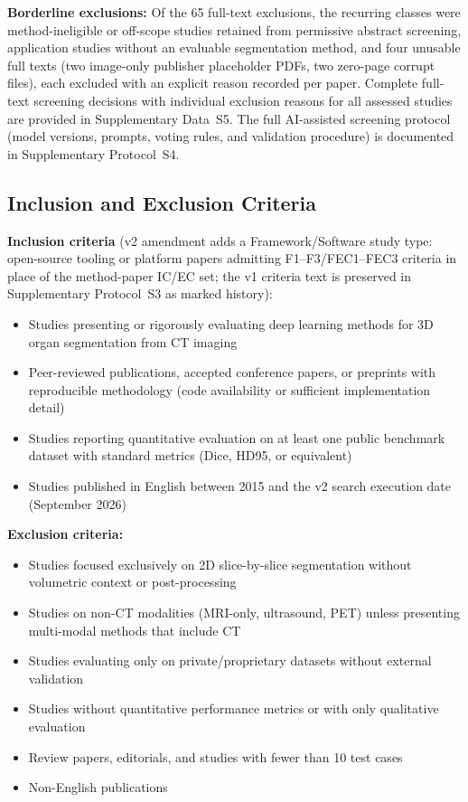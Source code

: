 \textbf{Borderline exclusions:} Of the 65 full-text exclusions, the recurring classes were method-ineligible or off-scope studies retained from permissive abstract screening, application studies without an evaluable segmentation method, and four unusable full texts (two image-only publisher placeholder PDFs, two zero-page corrupt files), each excluded with an explicit reason recorded per paper. Complete full-text screening decisions with individual exclusion reasons for all assessed studies are provided in Supplementary Data~S5. The full AI-assisted screening protocol (model versions, prompts, voting rules, and validation procedure) is documented in Supplementary Protocol~S4.

\subsection{Inclusion and Exclusion Criteria}

\textbf{Inclusion criteria} (v2 amendment adds a Framework/Software study type: open-source tooling or platform papers admitting F1--F3/FEC1--FEC3 criteria in place of the method-paper IC/EC set; the v1 criteria text is preserved in Supplementary Protocol~S3 as marked history):
\begin{itemize}
    \item Studies presenting or rigorously evaluating deep learning methods for 3D organ segmentation from CT imaging
    \item Peer-reviewed publications, accepted conference papers, or preprints with reproducible methodology (code availability or sufficient implementation detail)
    \item Studies reporting quantitative evaluation on at least one public benchmark dataset with standard metrics (Dice, HD95, or equivalent)
    \item Studies published in English between 2015 and the v2 search execution date (September 2026)
\end{itemize}

\textbf{Exclusion criteria:}
\begin{itemize}
    \item Studies focused exclusively on 2D slice-by-slice segmentation without volumetric context or post-processing
    \item Studies on non-CT modalities (MRI-only, ultrasound, PET) unless presenting multi-modal methods that include CT
    \item Studies evaluating only on private/proprietary datasets without external validation
    \item Studies without quantitative performance metrics or with only qualitative evaluation
    \item Review papers, editorials, and studies with fewer than 10 test cases
    \item Non-English publications
\end{itemize}

